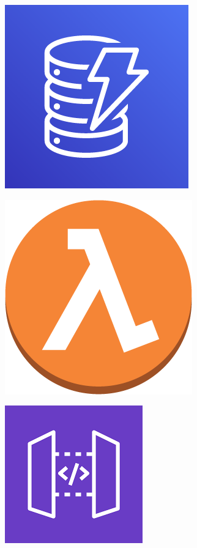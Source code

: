 \begin{center}
	\begin{minipage}{0.3\textwidth}
		\centering
		\includegraphics[scale=0.78]{Immagini/Backend/Amazon-DynamoDB.png}
	\end{minipage}
	\begin{minipage}{0.3\textwidth}
		\centering
		\includegraphics[scale=0.19]{Immagini/Backend/AWSLambda.png}
	\end{minipage}
	\begin{minipage}{0.3\textwidth}
		\centering
		\includegraphics[scale=0.26]{Immagini/Backend/Gateway.png}
	\end{minipage}
\end{center}
